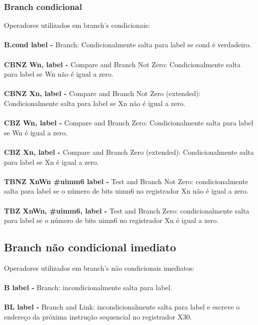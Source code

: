 \documentclass[12pt,a4paper,utf8]{ppgsi}
\begin{document}
\subsubsection{Branch condicional}
Operadores utilizados em branch's condicionais:
\\\\\textbf{B.cond label -} Branch: Condicionalmente salta para label se cond é verdadeiro.
\\\\\textbf{CBNZ Wn, label -} Compare and Branch Not Zero: Condicionalmente salta para label se Wn não é igual a zero.
\\\\\textbf{CBNZ Xn, label -} Compare and Branch Not Zero (extended): Condicionalmente salta para label se Xn não é igual a zero.
\\\\\textbf{CBZ Wn, label -} Compare and Branch Zero: Condicionalmente salta para label se Wn é igual a zero.
\\\\\textbf{CBZ Xn, label -} Compare and Branch Zero (extended): Condicionalmente salta para label se Xn é igual a zero.
\\\\\textbf{TBNZ Xn\textbar Wn \#uimm6 label -} Test and Branch Not Zero: condicionalmente salta para label se o número de bits uimn6 no registrador Xn não é igual a zero.
\\\\\textbf{TBZ Xn\textbar Wn, \#uimm6, label -} Test and Branch Zero: condicionalmente salta para label se o número de bits uimn6 no registrador Xn é igual a zero.

\subsection{Branch não condicional imediato}
Operadores utilizados em branch's não condicionais imediatos:
\\\\\textbf{B label -} Branch: incondicionalmente salta para label. 
\\\\\textbf{BL label -} Branch and Link: incondicionalmente salta para label e escreve o endereço da próxima instrução sequencial no registrador X30.
\end{document}
